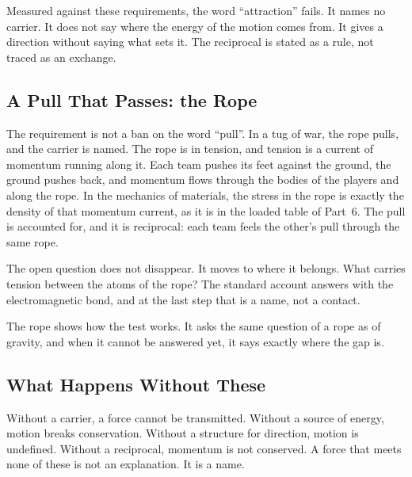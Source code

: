 \documentclass[11pt,a4paper]{article}
\begin{document}
Measured against these requirements, the word ``attraction'' fails. It names no carrier. It does not say where the energy of the motion comes from. It gives a direction without saying what sets it. The reciprocal is stated as a rule, not traced as an exchange.

\subsection*{A Pull That Passes: the Rope}

The requirement is not a ban on the word ``pull''. In a tug of war, the rope pulls, and the carrier is named. The rope is in tension, and tension is a current of momentum running along it. Each team pushes its feet against the ground, the ground pushes back, and momentum flows through the bodies of the players and along the rope. In the mechanics of materials, the stress in the rope is exactly the density of that momentum current, as it is in the loaded table of Part~6. The pull is accounted for, and it is reciprocal: each team feels the other's pull through the same rope.

The open question does not disappear. It moves to where it belongs. What carries tension between the atoms of the rope? The standard account answers with the electromagnetic bond, and at the last step that is a name, not a contact.  

The rope shows how the test works. It asks the same question of a rope as of gravity, and when it cannot be answered yet, it says exactly where the gap is.

\subsection*{What Happens Without These}

Without a carrier, a force cannot be transmitted. Without a source of energy, motion breaks conservation. Without a structure for direction, motion is undefined. Without a reciprocal, momentum is not conserved. A force that meets none of these is not an explanation. It is a name.
\end{document}
